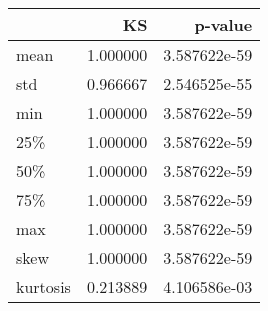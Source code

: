 \begin{tabular}{lrr}
\toprule
{} &        KS &       p-value \\
\midrule
mean     &  1.000000 &  3.587622e-59 \\
std      &  0.966667 &  2.546525e-55 \\
min      &  1.000000 &  3.587622e-59 \\
25\%      &  1.000000 &  3.587622e-59 \\
50\%      &  1.000000 &  3.587622e-59 \\
75\%      &  1.000000 &  3.587622e-59 \\
max      &  1.000000 &  3.587622e-59 \\
skew     &  1.000000 &  3.587622e-59 \\
kurtosis &  0.213889 &  4.106586e-03 \\
\bottomrule
\end{tabular}
